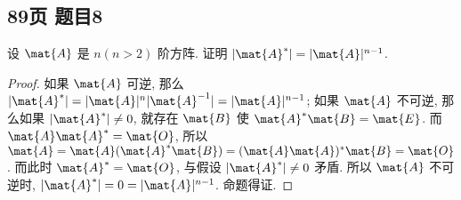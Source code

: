 \newpage
\subsection*{89页 题目8}
\begin{problem*}
    设 $\mat{A}$ 是 $n(n > 2)$ 阶方阵. 证明 $|\mat{A}^{\ast}| = |\mat{A}|^{n - 1}$.
\end{problem*}
\begin{proof}
    如果 $\mat{A}$ 可逆, 那么 $|\mat{A}^\ast| = |\mat{A}|^n|\mat{A}^{-1}| = |\mat{A}|^{n - 1} $; 如果 $\mat{A}$ 不可逆, 那么如果 $|\mat{A}^\ast| \not= 0$, 就存在 $\mat{B}$ 使 $\mat{A}^\ast \mat{B} = \mat{E}$. 而 $\mat{A}\mat{A}^\ast = \mat{O}$, 所以 $\mat{A} = \mat{A}(\mat{A}^\ast\mat{B}) = (\mat{A}\mat{A})^\ast\mat{B} = \mat{O}$. 而此时 $\mat{A}^\ast = \mat{O}$, 与假设 $|\mat{A}^\ast| \not= 0$ 矛盾. 所以 $\mat{A}$ 不可逆时, $|\mat{A}^\ast| = 0 = |\mat{A}|^{n - 1}$. 命题得证.
\end{proof}